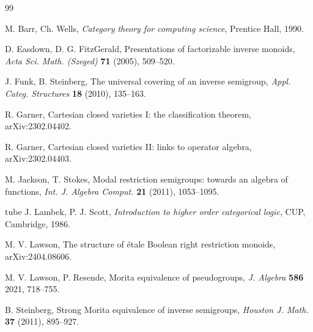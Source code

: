 \documentclass[a4paper]{amsart}
\begin{document}
\begin{thebibliography}{99}


 M. Barr, Ch. Wells, {\em Category theory for computing science}, Prentice Hall, 1990.



 D. Easdown, D. G. FitzGerald, Presentations of factorizable inverse monoids, 
{\em Acta Sci. Math. (Szeged)} {\bf 71} (2005), 509--520.

 J. Funk, B. Steinberg, The universal covering of an inverse semigroup,
{\em Appl. Categ. Structures} {\bf 18} (2010), 135--163.

 R. Garner, Cartesian closed varieties I: the classification theorem, arXiv:2302.04402.

 R. Garner, Cartesian closed varieties II: links to operator algebra, arXiv:2302.04403.

 M. Jackson, T. Stokes, Modal restriction semigroups: towards an algebra of functions,
{\em Int. J. Algebra Comput.} {\bf 21} (2011), 1053--1095.

tube
 J. Lambek, P. J. Scott, {\em Introduction to higher order categorical logic}, CUP, Cambridge, 1986.

 M. V. Lawson, The structure of \'etale Boolean right restriction monoids, arXiv:2404.08606.

 M. V. Lawson, P. Resende, Morita equivalence of pseudogroups, {\em J. Algebra} {\bf 586} 2021, 718--755.

 B. Steinberg, Strong Morita equivalence of inverse semigroups,
{\em Houston J. Math.} {\bf 37} (2011), 895--927.




\end{thebibliography}
\end{document}
